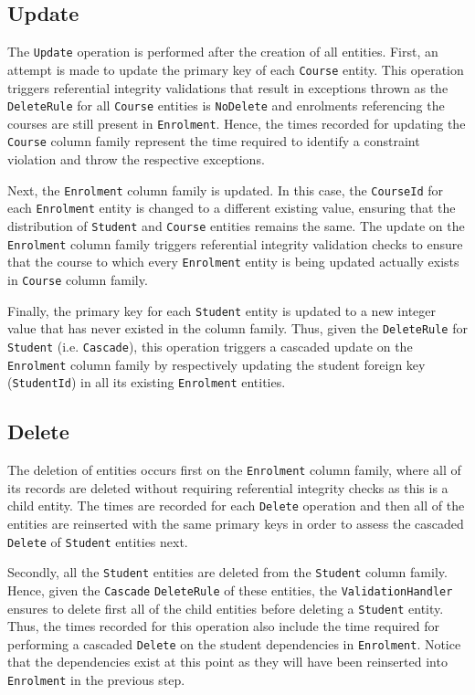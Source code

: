 \subsection{Update}
The \texttt{Update} operation is performed after the
creation of all entities.  First,  an attempt is made to update the primary key
of each \texttt{Course} entity.  This operation triggers referential integrity
 validations that result in exceptions thrown as the \texttt{DeleteRule} for all
 \texttt{Course} entities is \texttt{NoDelete} and enrolments referencing the
 courses are still present in \texttt{Enrolment}.  Hence, the times recorded for
  updating the \texttt{Course} column family represent the time required to
 identify a constraint violation and throw the respective exceptions.
					
Next,  the \texttt{Enrolment} column family is updated.  In this case,  the
\texttt{CourseId} for each \texttt{Enrolment} entity is changed to a different
existing value,  ensuring that the distribution of \texttt{Student} and
\texttt{Course} entities remains the same. The update on the \texttt{Enrolment}
column family triggers referential integrity validation checks to ensure that
the course to which every \texttt{Enrolment} entity is being updated actually
exists in \texttt{Course} column family. 
					
Finally,  the primary key for each \texttt{Student} entity is updated to a new
integer value that has never existed in the column family. Thus, given
the \texttt{DeleteRule} for \texttt{Student} (i.e. \texttt{Cascade}),  this
operation triggers a cascaded update on the \texttt{Enrolment} column family   
 by respectively updating the student foreign key (\texttt{StudentId}) in all
 its existing \texttt{Enrolment} entities.
		
\subsection{Delete} 
The deletion of entities occurs first on the
\texttt{Enrolment} column family,  where all of its records are deleted without
requiring referential integrity checks as this is a child entity.  The times are
recorded for each \texttt{Delete} operation and then all of the entities are
reinserted with the same primary keys in order to assess the cascaded
\texttt{Delete} of \texttt{Student} entities next. 
				
Secondly,  all  the \texttt{Student} entities are deleted from the
\texttt{Student} column family. Hence, given the \texttt{Cascade}
\texttt{DeleteRule} of these entities,  the \texttt{ValidationHandler} ensures
to delete first all of the child entities before deleting a \texttt{Student} entity. 
Thus,  the times recorded for this operation also include the time required for
performing a cascaded \texttt{Delete} on the student dependencies in
\texttt{Enrolment}.
Notice that the dependencies exist at this point as they will have been reinserted into
\texttt{Enrolment} in the previous step. 
				
